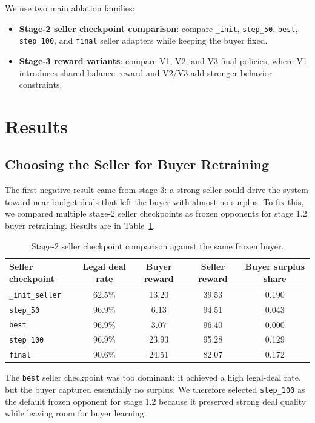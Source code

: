 \documentclass[11pt]{article}
\begin{document}
We use two main ablation families:
\begin{itemize}
    \item \textbf{Stage-2 seller checkpoint comparison}: compare \texttt{\_init}, \texttt{step\_50}, \texttt{best}, \texttt{step\_100}, and \texttt{final} seller adapters while keeping the buyer fixed.
    \item \textbf{Stage-3 reward variants}: compare V1, V2, and V3 final policies, where V1 introduces shared balance reward and V2/V3 add stronger behavior constraints.
\end{itemize}

\section{Results}

\subsection{Choosing the Seller for Buyer Retraining}

The first negative result came from stage 3: a strong seller could drive the system toward near-budget deals that left the buyer with almost no surplus. To fix this, we compared multiple stage-2 seller checkpoints as frozen opponents for stage 1.2 buyer retraining. Results are in Table~\ref{tab:seller-ckpt}.

\begin{table}[H]
\centering
\caption{Stage-2 seller checkpoint comparison against the same frozen buyer.}
\label{tab:seller-ckpt}
\begin{tabular}{lcccc}
\toprule
Seller checkpoint & Legal deal rate & Buyer reward & Seller reward & Buyer surplus share \\
\midrule
\texttt{\_init\_seller} & 62.5\% & 13.20 & 39.53 & 0.190 \\
\texttt{step\_50} & 96.9\% & 6.13 & 94.51 & 0.043 \\
\texttt{best} & 96.9\% & 3.07 & 96.40 & 0.000 \\
\texttt{step\_100} & 96.9\% & 23.93 & 95.28 & 0.129 \\
\texttt{final} & 90.6\% & 24.51 & 82.07 & 0.172 \\
\bottomrule
\end{tabular}
\end{table}

The \texttt{best} seller checkpoint was too dominant: it achieved a high legal-deal rate, but the buyer captured essentially no surplus. We therefore selected \texttt{step\_100} as the default frozen opponent for stage 1.2 because it preserved strong deal quality while leaving room for buyer learning.
\end{document}
